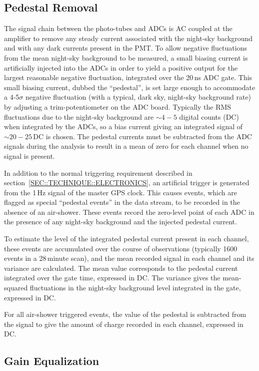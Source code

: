 \subsection{Pedestal Removal}
\label{SUBSEC::ANALYSIS::PEDESTAL}

The signal chain between the photo-tubes and ADCs is AC coupled at
the amplifier to remove any steady current associated with the
night-sky background and with any dark currents present in the PMT. To
allow negative fluctuations from the mean night-sky background to be
measured, a small biasing current is artificially injected into the
ADCs in order to yield a positive output for the largest reasonable
negative fluctuation, integrated over the 20\,ns ADC gate. This small
biasing current, dubbed the ``pedestal'', is set large enough to
accommodate a 4-5$\sigma$ negative fluctuation (with a typical, dark
sky, night-sky background rate) by adjusting a trim-potentiometer on
the ADC board. Typically the RMS fluctuations due to the night-sky
background are $\sim4-5$ digital counts (DC) when integrated by the
ADCs, so a bias current giving an integrated signal of $\sim20-25$\,DC
is chosen. The pedestal currents must be subtracted from the ADC
signals during the analysis to result in a mean of zero for each
channel when no signal is present.

In addition to the normal triggering requirement described in
section~\ref{SEC::TECHNIQUE::ELECTRONICS}, an artificial trigger is
generated from the 1\,Hz signal of the master GPS clock. This causes
events, which are flagged as special ``pedestal events'' in the data
stream, to be recorded in the absence of an air-shower. These events
record the zero-level point of each ADC in the presence of any
night-sky background and the injected pedestal current.

To estimate the level of the integrated pedestal current present in
each channel, these events are accumulated over the course of
observations (typically 1600 events in a 28\,minute scan), and the
mean recorded signal in each channel and its variance are
calculated. The mean value corresponds to the pedestal current
integrated over the gate time, expressed in DC. The variance gives
the mean-squared fluctuations in the night-sky background level
integrated in the gate, expressed in DC.

For all air-shower triggered events, the value of the pedestal is
subtracted from the signal to give the amount of charge recorded in
each channel, expressed in DC.

\subsection{Gain Equalization}
\label{SUBSEC::ANALYSIS::GAIN}

